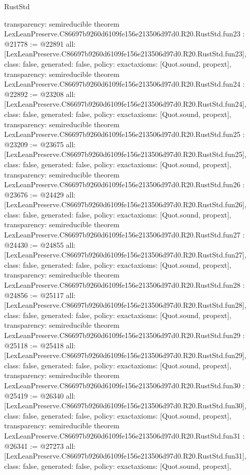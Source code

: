 \begin{lexlean}{RustStd}
\begin{coremodule}
{  transparency: semireducible
}
theorem LexLeanPreserve.C86697b9260d6109fe156e213506d97d0.R20.RustStd.fun23 : @21778 := @22891 {
  all: [LexLeanPreserve.C86697b9260d6109fe156e213506d97d0.R20.RustStd.fun23],
  class: false,
  generated: false,
  policy: exact{axioms: [Quot.sound, propext]},
  transparency: semireducible
}
theorem LexLeanPreserve.C86697b9260d6109fe156e213506d97d0.R20.RustStd.fun24 : @22892 := @23208 {
  all: [LexLeanPreserve.C86697b9260d6109fe156e213506d97d0.R20.RustStd.fun24],
  class: false,
  generated: false,
  policy: exact{axioms: [Quot.sound, propext]},
  transparency: semireducible
}
theorem LexLeanPreserve.C86697b9260d6109fe156e213506d97d0.R20.RustStd.fun25 : @23209 := @23675 {
  all: [LexLeanPreserve.C86697b9260d6109fe156e213506d97d0.R20.RustStd.fun25],
  class: false,
  generated: false,
  policy: exact{axioms: [Quot.sound, propext]},
  transparency: semireducible
}
theorem LexLeanPreserve.C86697b9260d6109fe156e213506d97d0.R20.RustStd.fun26 : @23676 := @24429 {
  all: [LexLeanPreserve.C86697b9260d6109fe156e213506d97d0.R20.RustStd.fun26],
  class: false,
  generated: false,
  policy: exact{axioms: [Quot.sound, propext]},
  transparency: semireducible
}
theorem LexLeanPreserve.C86697b9260d6109fe156e213506d97d0.R20.RustStd.fun27 : @24430 := @24855 {
  all: [LexLeanPreserve.C86697b9260d6109fe156e213506d97d0.R20.RustStd.fun27],
  class: false,
  generated: false,
  policy: exact{axioms: [Quot.sound, propext]},
  transparency: semireducible
}
theorem LexLeanPreserve.C86697b9260d6109fe156e213506d97d0.R20.RustStd.fun28 : @24856 := @25117 {
  all: [LexLeanPreserve.C86697b9260d6109fe156e213506d97d0.R20.RustStd.fun28],
  class: false,
  generated: false,
  policy: exact{axioms: [Quot.sound, propext]},
  transparency: semireducible
}
theorem LexLeanPreserve.C86697b9260d6109fe156e213506d97d0.R20.RustStd.fun29 : @25118 := @25418 {
  all: [LexLeanPreserve.C86697b9260d6109fe156e213506d97d0.R20.RustStd.fun29],
  class: false,
  generated: false,
  policy: exact{axioms: [Quot.sound, propext]},
  transparency: semireducible
}
theorem LexLeanPreserve.C86697b9260d6109fe156e213506d97d0.R20.RustStd.fun30 : @25419 := @26340 {
  all: [LexLeanPreserve.C86697b9260d6109fe156e213506d97d0.R20.RustStd.fun30],
  class: false,
  generated: false,
  policy: exact{axioms: [Quot.sound, propext]},
  transparency: semireducible
}
theorem LexLeanPreserve.C86697b9260d6109fe156e213506d97d0.R20.RustStd.fun31 : @26341 := @27273 {
  all: [LexLeanPreserve.C86697b9260d6109fe156e213506d97d0.R20.RustStd.fun31],
  class: false,
  generated: false,
  policy: exact{axioms: [Quot.sound, propext]},
}
\end{coremodule}
\end{lexlean}
